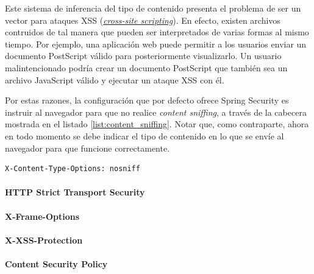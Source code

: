 \documentclass[a4paper]{article}
\begin{document}
	Este sistema de inferencia del tipo de contenido presenta el problema de ser un vector para ataques XSS (\href{https://owasp.org/www-community/attacks/xss/}{\emph{cross-site scripting}}). En efecto, existen archivos contruidos de tal manera que pueden ser interpretados de varias formas al mismo tiempo. Por ejemplo, una aplicación web puede permitir a los usuarios enviar un documento PostScript válido para posteriormente visualizarlo. Un usuario malintencionado podría crear un documento PostScript que también sea un archivo JavaScript válido y ejecutar un ataque XSS con él.
	
	Por estas razones, la configuración que por defecto ofrece Spring Security es instruir al navegador para que no realice \emph{content sniffing}, a través de la cabecera mostrada en el listado \ref{list:content_sniffing}. Notar que, como contraparte, ahora en todo momento se debe indicar el tipo de contenido en lo que se envíe al navegador para que funcione correctamente.
	\\
	
	\begin{lstlisting}[caption=Cabeceras para impedir el almacenamiento en caché, label=list:content_sniffing]
	X-Content-Type-Options: nosniff
	\end{lstlisting}
	
	\paragraph{HTTP Strict Transport Security}
	\paragraph{X-Frame-Options}
	\paragraph{X-XSS-Protection}
	\paragraph{Content Security Policy}
	
\end{document}
